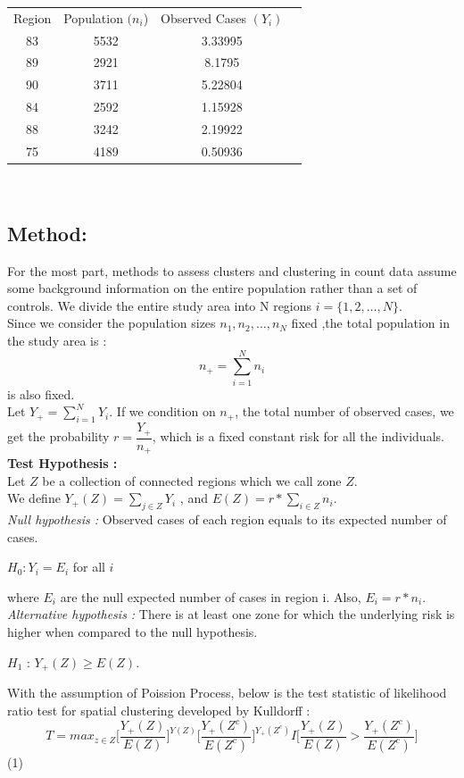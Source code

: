 \documentclass[12pt]{article}
\begin{document}
		\begin{tabular}{|c|c|c|c|}
		\hline
		Region & Population $(n_i$)& Observed Cases $(Y_i)$ & \\ 
		83 & 5532& 3.33995 & \\
		89 & 2921& 8.1795 & \\
		90 & 3711& 5.22804 & \\
		84 & 2592& 1.15928 & \\
		88 & 3242& 2.19922 & \\
		75 & 4189& 0.50936 & \\
		\hline
		\end{tabular}\\
			
			\subsection{Method:} 

			For the most part, methods to assess clusters and clustering in count data assume some background information on the entire population rather than a set of controls. 
			We divide the entire study area into N regions $ i = \{1,2,\dots,N\}$. \\
			Since we consider the population sizes $n_1,n_2,\dots,n_N$ fixed ,the total population in the study area is : \\
\[
n_+ = \sum_{i =1}^{N}n_i
\]
is also fixed. \\
Let $Y_+ = \sum_{i=1}^{N} Y_i$. If we condition on $n_+$, the total number of observed cases, we get the probability $ r = \dfrac{Y_+}{n_+}$, which is a fixed constant risk for all the individuals.\\
		
			\textbf{Test Hypothesis :} \\ 
			Let $Z$ be a collection of connected regions which we call zone $Z$. \\
			We define $Y_+(Z) = \sum_{j \in Z} Y_i$ , and $E(Z) = r*\sum_{i \in Z} n_i$. \\
			
			\textit{Null hypothesis :} Observed cases of each region equals to its expected number of cases. \\ 
			\begin{center}
			$H_0 : Y_i = E_i$ for all $i$
			 \end{center}
			 where $E_i$ are the null expected number of cases in region i. Also, $E_i = r * n_i$.\\
			
			
			\textit{Alternative hypothesis :} There is at least one zone for which the underlying risk is higher when compared to the null hypothesis. \\
 			\begin{center}
			$H_1$ : $Y_+(Z) \geq E(Z)$. \\
			\end{center}	
			With the assumption of Poission Process, below is the test statistic of likelihood ratio test for spatial clustering developed by Kulldorff : \\
				\[
					T = max_{z\in Z} \bigg[\dfrac{Y_+(Z)}{E(Z)}\bigg]^{Y(Z)} \bigg[\dfrac{Y_+(Z^c)}{E(Z^c)}\bigg]^{Y_+(Z^c)} I\bigg[\dfrac{Y_+(Z)}{E(Z)} > \dfrac{Y_+(Z^c)}{E(Z^c)}\bigg]
				\]	  (1)
		
\end{document}
